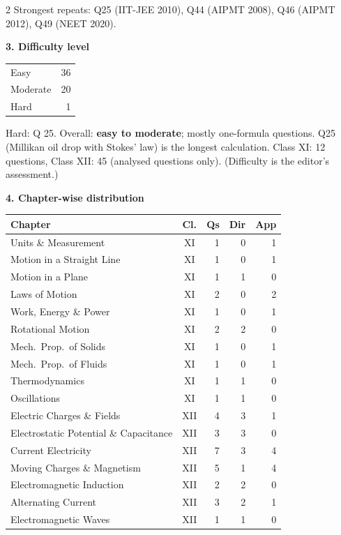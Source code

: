 \begin{multicols}{2}
{\footnotesize Strongest repeats: Q25 (IIT-JEE 2010), Q44 (AIPMT 2008), Q46 (AIPMT 2012), Q49 (NEET 2020).}\par\medskip
\textbf{\color{crimson}3. Difficulty level}\par\smallskip
\begin{tabular}{@{}lr@{}}\toprule
Easy & 36\\ Moderate & 20\\ Hard & 1\\\bottomrule\end{tabular}\par\smallskip
{\footnotesize Hard: Q 25. Overall: \textbf{easy to moderate}; mostly one-formula questions. Q25 (Millikan oil drop with Stokes' law) is the longest calculation. Class XI: 12 questions, Class XII: 45 (analysed questions only). (Difficulty is the editor's assessment.)}\par\medskip
\columnbreak
\textbf{\color{crimson}4. Chapter-wise distribution}\par\smallskip
{\footnotesize\begin{tabular}{@{}p{4.7cm}c@{\,}r@{\,}r@{\,}r@{}}\toprule
Chapter & Cl. & Qs & Dir & App\\\midrule
Units \& Measurement & XI & 1 & 0 & 1\\
Motion in a Straight Line & XI & 1 & 0 & 1\\
Motion in a Plane & XI & 1 & 1 & 0\\
Laws of Motion & XI & 2 & 0 & 2\\
Work, Energy \& Power & XI & 1 & 0 & 1\\
Rotational Motion & XI & 2 & 2 & 0\\
Mech.\ Prop.\ of Solids & XI & 1 & 0 & 1\\
Mech.\ Prop.\ of Fluids & XI & 1 & 0 & 1\\
Thermodynamics & XI & 1 & 1 & 0\\
Oscillations & XI & 1 & 1 & 0\\
Electric Charges \& Fields & XII & 4 & 3 & 1\\
Electrostatic Potential \& Capacitance & XII & 3 & 3 & 0\\
Current Electricity & XII & 7 & 3 & 4\\
Moving Charges \& Magnetism & XII & 5 & 1 & 4\\
Electromagnetic Induction & XII & 2 & 2 & 0\\
Alternating Current & XII & 3 & 2 & 1\\
Electromagnetic Waves & XII & 1 & 1 & 0\\

\end{tabular}}
\end{multicols}
